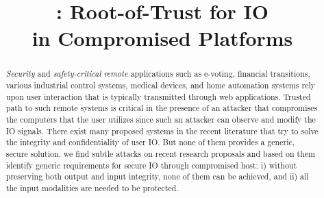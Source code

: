 \newif\ifccs
\ccsfalse

\ifccs

\else

\fi



\newif\ifdesperatetime

\graphicspath{{images/}}


\title{\name: Root-of-Trust for IO \\ in Compromised Platforms}

\ifccs
\else
\maketitle
\fi

\thispagestyle{plain}
\pagestyle{plain}

\begin{abstract}
 

\emph{Security} and \emph{safety-critical} \emph{remote} applications such as e-voting, financial transitions, various industrial control systems, medical devices, and home automation systems rely upon user interaction that is typically transmitted through web applications. Trusted path to such remote systems is critical in the presence of an attacker that compromises the computers that the user utilizes since such an attacker can observe and modify the IO signals. There exist many proposed systems in the recent literature that try to solve the integrity and confidentiality of user IO. But none of them provides a generic, secure solution. we find subtle attacks on recent research proposals and based on them identify generic requirements for secure IO through compromised host: i) without preserving both output and input integrity, none of them can be achieved, and ii) all the input modalities are needed to be protected.    


\end{abstract}
